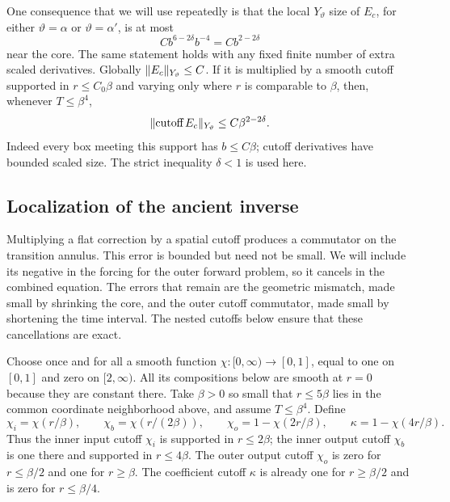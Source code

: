 One consequence that we will use repeatedly is that the local
$Y_\vartheta$ size of $E_c$, for either $\vartheta=\alpha$ or
$\vartheta=\alpha'$, is at most
\begin{equation}\label{glue:error-weight}
 C b^{6-2\delta}b^{-4}=C b^{2-2\delta}
\end{equation}
near the core.  The same statement holds with any fixed finite number
of extra scaled derivatives.  Globally $\lVert E_c\rVert_{Y_\vartheta}\le C$.
If it is multiplied by a smooth cutoff supported in $r\le C_0\beta$
and varying only where $r$ is comparable to $\beta$, then, whenever
$T\le\beta^4$,
\begin{equation}\label{glue:core-error-small}
 \lVert \text{cutoff}\,E_c\rVert_{Y_\vartheta}
 \le C\beta^{2-2\delta}.
\end{equation}
Indeed every box meeting this support has $b\le C\beta$; cutoff
derivatives have bounded scaled size.  The strict inequality
$\delta<1$ is used here.

\subsection{Localization of the ancient inverse}

Multiplying a flat correction by a spatial cutoff produces a commutator
on the transition annulus.  This error is bounded but need not be small.
We will include its negative in the forcing for the outer forward
problem, so it cancels in the combined equation.  The errors that remain
are the geometric mismatch, made small by shrinking the core, and the
outer cutoff commutator, made small by shortening the time interval.
The nested cutoffs below ensure that these cancellations are exact.

Choose once and for all a smooth function
$\chi:[0,\infty)\to[0,1]$, equal to one on $[0,1]$ and zero on
$[2,\infty)$.  All its compositions below are smooth at $r=0$
because they are constant there.  Take $\beta>0$ so small that
$r\le5\beta$ lies in the common coordinate neighborhood above, and
assume $T\le\beta^4$.  Define
\begin{equation}\label{glue:cutoffs}
 \chi_i=\chi(r/\beta),\qquad
 \chi_b=\chi(r/(2\beta)),\qquad
 \chi_o=1-\chi(2r/\beta),\qquad
 \kappa=1-\chi(4r/\beta).
\end{equation}
Thus the inner input cutoff $\chi_i$ is supported in $r\le2\beta$;
the inner output cutoff $\chi_b$ is one there and supported in
$r\le4\beta$.  The outer output cutoff $\chi_o$ is zero for
$r\le\beta/2$ and one for $r\ge\beta$.  The coefficient cutoff
$\kappa$ is already one for $r\ge\beta/2$ and is zero for
$r\le\beta/4$.

